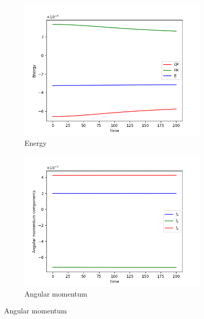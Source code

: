 \begin{figure}[htp]
    \centering
    \begin{subfigure}[b]{0.45\textwidth}
        \centering
        \includegraphics[width=\textwidth]{chapters/results/img/bh-cluster/energy.png}
        \caption{Energy}
        \label{fig:physical-quantities-bh-cluster-sub1}
    \end{subfigure}
    \hfill
    \begin{subfigure}[b]{0.45\textwidth}
        \centering
        \includegraphics[width=\textwidth]{chapters/results/img/bh-cluster/angular-momentum.png}
        \caption{Angular momentum}
        \label{fig:physical-quantities-bh-cluster-sub2}
    \end{subfigure}


\end{figure}
